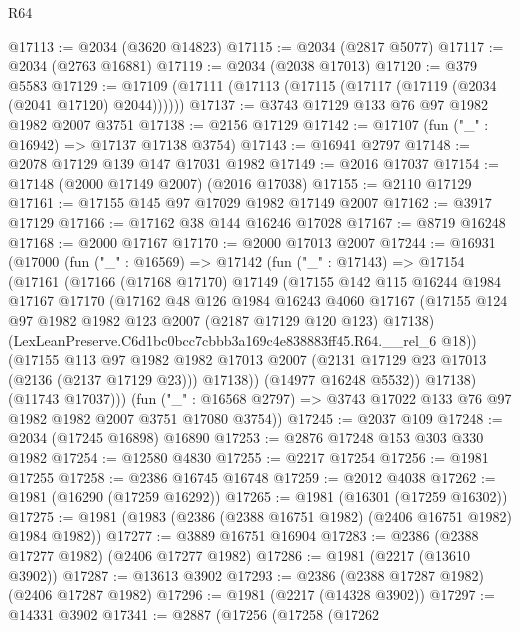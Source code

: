 \begin{lexlean}{R64}
\begin{coremodule}
@17113 := @2034 (@3620 @14823)
@17115 := @2034 (@2817 @5077)
@17117 := @2034 (@2763 @16881)
@17119 := @2034 (@2038 @17013)
@17120 := @379 @5583
@17129 := @17109 (@17111 (@17113 (@17115 (@17117 (@17119 (@2034 (@2041 @17120) @2044))))))
@17137 := @3743 @17129 @133 @76 @97 @1982 @1982 @2007 @3751
@17138 := @2156 @17129
@17142 := @17107 (fun ("_" : @16942) => @17137 @17138 @3754)
@17143 := @16941 @2797
@17148 := @2078 @17129 @139 @147 @17031 @1982
@17149 := @2016 @17037
@17154 := @17148 (@2000 @17149 @2007) (@2016 @17038)
@17155 := @2110 @17129
@17161 := @17155 @145 @97 @17029 @1982 @17149 @2007
@17162 := @3917 @17129
@17166 := @17162 @38 @144 @16246 @17028
@17167 := @8719 @16248
@17168 := @2000 @17167
@17170 := @2000 @17013 @2007
@17244 := @16931
    (@17000
      (fun ("_" : @16569) =>
      @17142
        (fun ("_" : @17143) =>
        @17154
          (@17161
            (@17166
              (@17168 @17170)
              @17149
              (@17155
                @142
                @115
                @16244
                @1984
                @17167
                @17170
                (@17162
                  @48
                  @126
                  @1984
                  @16243
                  @4060
                  @17167
                  (@17155 @124 @97 @1982 @1982 @123 @2007 (@2187 @17129 @120 @123) @17138)
                  (LexLeanPreserve.C6d1bc0bcc7cbbb3a169c4e838883ff45.R64.__rel_6 @18))
                (@17155
                  @113
                  @97
                  @1982
                  @1982
                  @17013
                  @2007
                  (@2131 @17129 @23 @17013 (@2136 (@2137 @17129 @23)))
                  @17138))
              (@14977 @16248 @5532))
            @17138)
          (@11743 @17037)))
      (fun ("_" : @16568 @2797) => @3743 @17022 @133 @76 @97 @1982 @1982 @2007 @3751 @17080 @3754))
@17245 := @2037 @109
@17248 := @2034 (@17245 @16898) @16890
@17253 := @2876 @17248 @153 @303 @330 @1982
@17254 := @12580 @4830
@17255 := @2217 @17254
@17256 := @1981 @17255
@17258 := @2386 @16745 @16748
@17259 := @2012 @4038
@17262 := @1981 (@16290 (@17259 @16292))
@17265 := @1981 (@16301 (@17259 @16302))
@17275 := @1981 (@1983 (@2386 (@2388 @16751 @1982) (@2406 @16751 @1982) @1984 @1982))
@17277 := @3889 @16751 @16904
@17283 := @2386 (@2388 @17277 @1982) (@2406 @17277 @1982)
@17286 := @1981 (@2217 (@13610 @3902))
@17287 := @13613 @3902
@17293 := @2386 (@2388 @17287 @1982) (@2406 @17287 @1982)
@17296 := @1981 (@2217 (@14328 @3902))
@17297 := @14331 @3902
@17341 := @2887
    (@17256
      (@17258
        (@17262

\end{coremodule}
\end{lexlean}

